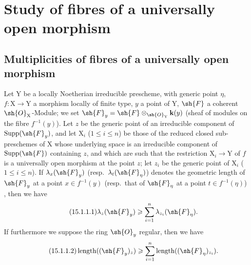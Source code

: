 \section{Study of fibres of a universally open morphism}
\label{section:IV.15}

\subsection{Multiplicities of fibres of a universally open morphism}
\label{subsection:IV.15.1}

\begin{proposition}[15.1.1]
\label{IV.15.1.1}
Let $\mathrm{Y}$ be a locally Noetherian irreducible prescheme, with generic point $\eta$, $f:\mathrm{X}\to\mathrm{Y}$ a morphism locally of finite type, $y$ a point of $\mathrm{Y}$, $\sh{F}$ a coherent $\sh{O}_\mathrm{X}$-Module;
we set $\sh{F}_y=\sh{F}\otimes_{\sh{O}_\mathrm{Y}}\mathbf{k}(y)$ (sheaf of modules on the fibre $f^{-1}(y)$).
Let $z$ be the generic point of an irreducible component of $\operatorname{Supp}(\sh{F}_y)$, and let $\mathrm{X}_i$ ($1\leqslant i\leqslant n$) be those of the reduced closed sub-preschemes of $\mathrm{X}$ whose underlying space is an irreducible component of $\operatorname{Supp}(\sh{F})$ containing $z$, and which are such that the restriction $\mathrm{X}_i\to\mathrm{Y}$ of $f$ is a universally open morphism at the point $z$; let $z_i$ be the generic point of $\mathrm{X}_i$ ($1\leqslant i\leqslant n$).
If $\lambda_x(\sh{F}_y)$ (resp.~$\lambda_t(\sh{F}_\eta)$) denotes the geometric length of $\sh{F}_y$ at a point $x\in f^{-1}(y)$ (resp.~that of $\sh{F}_\eta$ at a point $t\in f^{-1}(\eta)$) , then we have
\[
\tag{15.1.1.1}
\label{IV.15.1.1.1}
  \lambda_z(\sh{F}_y)\geqslant\sum_{i=1}^{n}\lambda_{z_i}(\sh{F}_\eta).
\]
If furthermore we suppose the ring $\sh{O}_y$ regular, then we have
\[
\tag{15.1.1.2}
\label{IV.15.1.1.2}
  \operatorname{length}((\sh{F}_y)_z)\geqslant\sum_{i=1}^{n}\operatorname{length}((\sh{F}_\eta)_{z_i}).
\]
\end{proposition}

